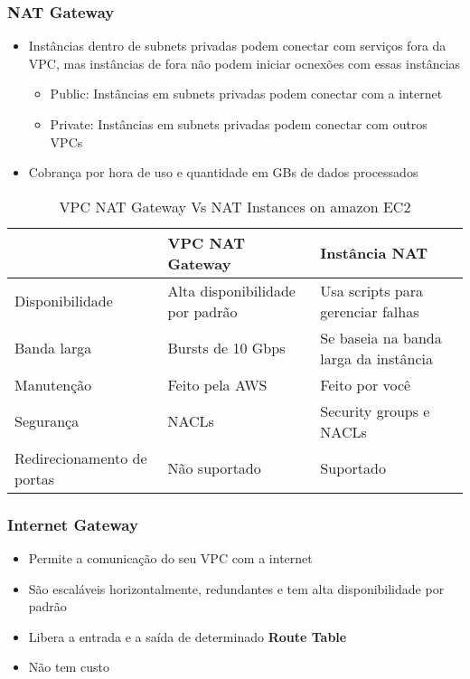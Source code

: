 \begin{frame}[allowframebreaks]
	\frametitle{NAT Gateway}
	\begin{itemize}
		\item Instâncias dentro de subnets privadas podem conectar com serviços fora da VPC, mas instâncias de fora não podem iniciar ocnexões com essas instâncias
			\begin{itemize}
				\item Public: Instâncias em subnets privadas podem conectar com a internet
				\item Private: Instâncias em subnets privadas podem conectar com outros VPCs
			\end{itemize}
		\item Cobrança por hora de uso e quantidade em GBs de dados processados
	\end{itemize}
	\framebreak
	\begin{scriptsize}
	\begin{table}[htpb]
		\centering
		\caption{VPC NAT Gateway Vs NAT Instances on amazon EC2}
		\begin{tabular}{|p{3cm}|p{3cm}|p{3cm}|}
			\hline
			& VPC NAT Gateway & Instância NAT  \\
			\hline \hline
			Disponibilidade & Alta disponibilidade por padrão & Usa scripts para gerenciar falhas \\
			\hline
			Banda larga & Bursts de 10 Gbps & Se baseia na banda larga da instância \\
			\hline
			Manutenção & Feito pela AWS & Feito por você \\
			\hline
			Segurança & NACLs & Security groups e NACLs \\
			\hline
			Redirecionamento de portas & Não suportado & Suportado \\
			\hline
		\end{tabular}
	\end{table}
	\end{scriptsize}
\end{frame}
\begin{frame}
	\frametitle{Internet Gateway}
	\begin{itemize}
		\item Permite a comunicação do seu VPC com a internet
		\item São escaláveis horizontalmente, redundantes e tem alta disponibilidade por padrão
		\item Libera a entrada e a saída de determinado \textbf{Route Table}
		\item Não tem custo
	\end{itemize}
\end{frame}


